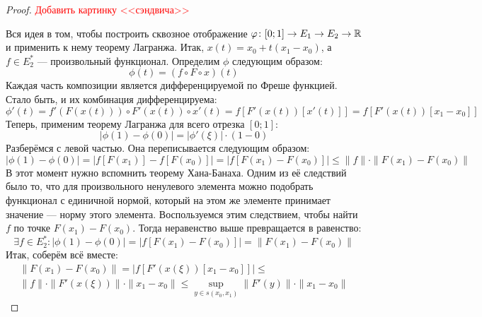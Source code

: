 \begin{proof}
	\textcolor{red}{Добавить картинку <<сэндвича>>}
	
	Вся идея в том, чтобы построить сквозное отображение $\varphi \colon [0; 1] \to E_1 \to E_2 \to \mathbb{R}$ и применить к нему теорему Лагранжа. Итак, $x(t) = x_0 + t(x_1 - x_0)$, а $f \in E_2^*$ --- произвольный функционал. Определим $\phi$ следующим образом:
	\[
		\phi(t) = (f \circ F \circ x)(t)
	\]
	Каждая часть композиции является дифференцируемой по Фреше функцией. Стало быть, и их комбинация дифференцируема:
	\[
		\phi'(t) = f'(F(x(t))) \circ F'(x(t)) \circ x'(t) = f[F'(x(t))[x'(t)]] = f[F'(x(t))[x_1 - x_0]]
	\]
	Теперь, применим теорему Лагранжа для всего отрезка $[0; 1]$:
	\[
		|\phi(1) - \phi(0)| = |\phi'(\xi)| \cdot (1 - 0)
	\]
	Разберёмся с левой частью. Она переписывается следующим образом:
	\[
		|\phi(1) - \phi(0)| = |f[F(x_1)] - f[F(x_0)]| = |f[F(x_1) - F(x_0)]| \le \|f\| \cdot \|F(x_1) - F(x_0)\|
	\]
	В этот момент нужно вспомнить теорему Хана-Банаха. Одним из её следствий было то, что для произвольного ненулевого элемента можно подобрать функционал с единичной нормой, который на этом же элементе принимает значение --- норму этого элемента. Воспользуемся этим следствием, чтобы найти $f$ по точке $F(x_1) - F(x_0)$. Тогда неравенство выше превращается в равенство:
	\[
		\exists f \in E_2^* \colon |\phi(1) - \phi(0)| = |f[F(x_1) - F(x_0)]| = \|F(x_1) - F(x_0)\|
	\]
	Итак, соберём всё вместе:
	\begin{multline*}
		\|F(x_1) - F(x_0)\| = |f[F'(x(\xi))[x_1 - x_0]]| \le
		\\
		\|f\| \cdot \|F'(x(\xi))\| \cdot \|x_1 - x_0\| \le \sup_{y \in s(x_0, x_1)} \|F'(y)\| \cdot \|x_1 - x_0\|
	\end{multline*}
\end{proof}